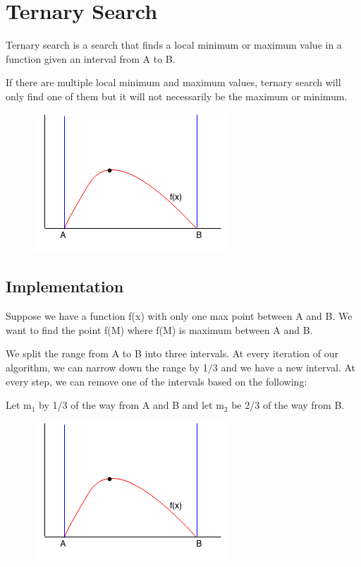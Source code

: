\documentclass[11pt,oneside]{book}
\makeatletter
\def\maxwidth#1{\ifdim\Gin@nat@width>#1 #1\else\Gin@nat@width\fi}
\makeatother
\begin{document}
        \section{ Ternary Search }
        

Ternary search is a search that finds a local minimum or maximum value in a function given an interval from A to B.

If there are multiple local minimum and maximum values, ternary search will only find one of them but it will not necessarily be the maximum or minimum.

\vspace{5px}\begin{figure}[H]\centering
        \includegraphics[width=0.66\maxwidth{\textwidth}]{ternarysearch.png}
        \end{figure}

\subsection{Implementation}

Suppose we have a function f(x) with only one max point between A and B. We want to find the point f(M) where f(M) is maximum between A and B.

We split the range from A to B into three intervals. At every iteration of our algorithm, we can narrow down the range by 1/3 and we have a new interval. At every step, we can remove one of the intervals based on the following:

Let m$_{1}$ by 1/3 of the way from A and B and let m$_{2}$ be 2/3 of the way from B.

\vspace{5px}\begin{figure}[H]\centering
        \includegraphics[width=0.66\maxwidth{\textwidth}]{ternarysearch.png}
        \end{figure}
\end{document}

